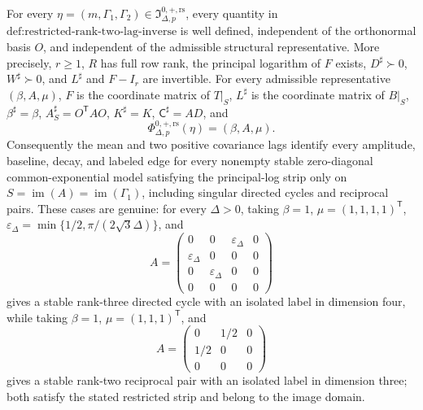 For every \(\eta=(m,\Gamma_1,\Gamma_2)\in\mathfrak I_{\Delta,p}^{0,+,\mathrm{rs}}\), every quantity in \(\text{def:restricted-rank-two-lag-inverse}\) is well defined, independent of the orthonormal basis \(O\), and independent of the admissible structural representative.  More precisely, \(r\geq1\), \(R\) has full row rank, the principal logarithm of \(F\) exists, \(D^\sharp\succ0\), \(W^\sharp\succ0\), and \(L^\sharp\) and \(F-I_r\) are invertible.  For every admissible representative \((\beta,A,\mu)\), \(F\) is the coordinate matrix of \(T|_S\), \(L^\sharp\) is the coordinate matrix of \(B|_S\), \(\beta^\sharp=\beta\), \(A_S^\sharp=O^{\mathsf T}AO\), \(K^\sharp=K\), \(\mathsf C^\sharp=AD\), and
\[
 \Phi_{\Delta,p}^{0,+,\mathrm{rs}}(\eta)=(\beta,A,\mu).
\]
Consequently the mean and two positive covariance lags identify every amplitude, baseline, decay, and labeled edge for every nonempty stable zero-diagonal common-exponential model satisfying the principal-log strip only on \(S=\operatorname{im}(A)=\operatorname{im}(\Gamma_1)\), including singular directed cycles and reciprocal pairs.  These cases are genuine: for every \(\Delta>0\), taking \(\beta=1\), \(\mu=(1,1,1,1)^{\mathsf T}\), \(\varepsilon_\Delta=\min\{1/2,\pi/(2\sqrt3\Delta)\}\), and
\[
 A=\begin{pmatrix}
 0&0&\varepsilon_\Delta&0\\
 \varepsilon_\Delta&0&0&0\\
 0&\varepsilon_\Delta&0&0\\
 0&0&0&0
 \end{pmatrix}
\]
gives a stable rank-three directed cycle with an isolated label in dimension four, while taking \(\beta=1\), \(\mu=(1,1,1)^{\mathsf T}\), and
\[
 A=\begin{pmatrix}0&1/2&0\\1/2&0&0\\0&0&0\end{pmatrix}
\]
gives a stable rank-two reciprocal pair with an isolated label in dimension three; both satisfy the stated restricted strip and belong to the image domain.